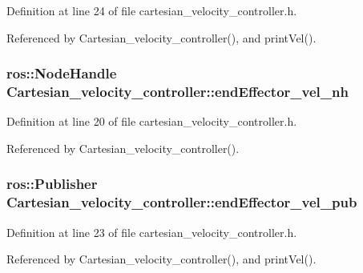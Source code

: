 Definition at line 24 of file cartesian\-\_\-velocity\-\_\-controller.\-h.



Referenced by Cartesian\-\_\-velocity\-\_\-controller(), and print\-Vel().

\hypertarget{classCartesian__velocity__controller_a01cbe7f951c69ded8604e552a0a706e0}{
\subsubsection[{end\-Effector\-\_\-vel\-\_\-nh}]{\setlength{\rightskip}{0pt plus 5cm}ros\-::\-Node\-Handle Cartesian\-\_\-velocity\-\_\-controller\-::end\-Effector\-\_\-vel\-\_\-nh\hspace{0.3cm}{\ttfamily [protected]}}}\label{classCartesian__velocity__controller_a01cbe7f951c69ded8604e552a0a706e0}


Definition at line 20 of file cartesian\-\_\-velocity\-\_\-controller.\-h.



Referenced by Cartesian\-\_\-velocity\-\_\-controller().

\hypertarget{classCartesian__velocity__controller_ab12287816ae785d3cd6243b3df0cffc6}{
\subsubsection[{end\-Effector\-\_\-vel\-\_\-pub}]{\setlength{\rightskip}{0pt plus 5cm}ros\-::\-Publisher Cartesian\-\_\-velocity\-\_\-controller\-::end\-Effector\-\_\-vel\-\_\-pub\hspace{0.3cm}{\ttfamily [protected]}}}\label{classCartesian__velocity__controller_ab12287816ae785d3cd6243b3df0cffc6}


Definition at line 23 of file cartesian\-\_\-velocity\-\_\-controller.\-h.



Referenced by Cartesian\-\_\-velocity\-\_\-controller(), and print\-Vel().


